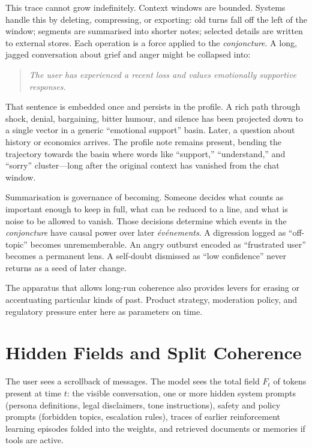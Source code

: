 \documentclass[12pt,a4paper]{article}
\begin{document}
This trace cannot grow indefinitely. Context windows are bounded. Systems handle this by deleting, compressing, or exporting: old turns fall off the left of the window; segments are summarised into shorter notes; selected details are written to external stores. Each operation is a force applied to the \emph{conjoncture}. A long, jagged conversation about grief and anger might be collapsed into:

\begin{quote}
\textit{The user has experienced a recent loss and values emotionally supportive responses.}
\end{quote}

That sentence is embedded once and persists in the profile. A rich path through shock, denial, bargaining, bitter humour, and silence has been projected down to a single vector in a generic ``emotional support'' basin. Later, a question about history or economics arrives. The profile note remains present, bending the trajectory towards the basin where words like ``support,'' ``understand,'' and ``sorry'' cluster---long after the original context has vanished from the chat window.

Summarisation is governance of becoming. Someone decides what counts as important enough to keep in full, what can be reduced to a line, and what is noise to be allowed to vanish. Those decisions determine which events in the \emph{conjoncture} have causal power over later \emph{\'ev\'enements}. A digression logged as ``off-topic'' becomes unrememberable. An angry outburst encoded as ``frustrated user'' becomes a permanent lens. A self-doubt dismissed as ``low confidence'' never returns as a seed of later change.

The apparatus that allows long-run coherence also provides levers for erasing or accentuating particular kinds of past. Product strategy, moderation policy, and regulatory pressure enter here as parameters on time.

\section{Hidden Fields and Split Coherence}

The user sees a scrollback of messages. The model sees the total field $F_t$ of tokens present at time $t$: the visible conversation, one or more hidden system prompts (persona definitions, legal disclaimers, tone instructions), safety and policy prompts (forbidden topics, escalation rules), traces of earlier reinforcement learning episodes folded into the weights, and retrieved documents or memories if tools are active.
\end{document}

